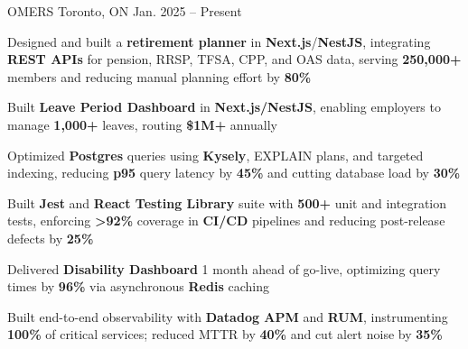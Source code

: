 \documentclass[11pt, a4paper]{awesome-cv}
\begin{document}
\makecvheader[C]


\begin{cventries}


  \cventry
    {\color{lightblue}{ASSOCIATE FULL-STACK ENGINEER}}
    {OMERS}
    {Toronto, ON}
    {Jan. 2025 -- Present}
    {
      \begin{cvitems}
        \item{Designed and built a \textbf{retirement planner} in \textbf{Next.js}/\textbf{NestJS}, integrating \textbf{REST APIs} for pension, RRSP, TFSA, CPP, and OAS data, serving \textbf{250,000+} members and reducing manual planning effort by \textbf{80\%}}
        \item{Built \textbf{Leave Period Dashboard} in \textbf{Next.js/NestJS}, enabling employers to manage \textbf{1,000+} leaves, routing \textbf{\$1M+} annually}
        \item{Optimized \textbf{Postgres} queries using \textbf{Kysely}, EXPLAIN plans, and targeted indexing, reducing \textbf{p95} query latency by \textbf{45\%} and cutting database load by \textbf{30\%}}
        \item{Built \textbf{Jest} and \textbf{React Testing Library} suite with \textbf{500+} unit and integration tests, enforcing \textbf{>92\%} coverage in \textbf{CI/CD} pipelines and reducing post-release defects by \textbf{25\%}}
        \item{Delivered \textbf{Disability Dashboard} 1 month ahead of go-live, optimizing query times by \textbf{96\%} via asynchronous \textbf{Redis} caching}
        \item{Built end-to-end observability with \textbf{Datadog APM} and \textbf{RUM}, instrumenting \textbf{100\%} of critical services; reduced MTTR by \textbf{40\%} and cut alert noise by \textbf{35\%}}
      \end{cvitems}
    }

  \vspace{3mm}


\end{cventries}
\end{document}
